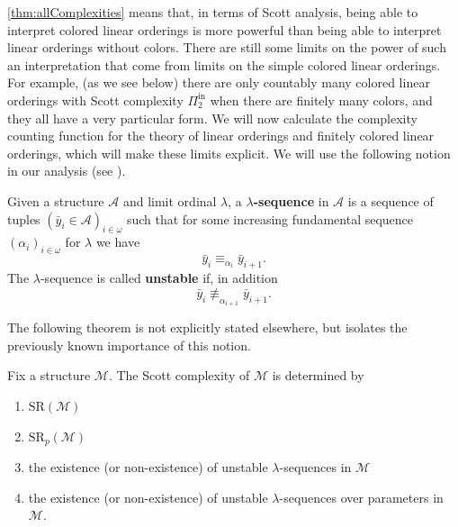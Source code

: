 \documentclass[11pt]{amsart}
\newcommand{\M}{\mathcal{M}}
\newcommand{\SR}{\text{SR}}
\newcommand{\mc}[1]{\mathcal{#1}}
\newcommand{\Pinf}[1]{\Pi^{\mathrm{in}}_{#1}}
\def\M{{\mathcal M}}
\theoremstyle{remark}
\newcommand{\define}[1]{\textbf{#1}}
\begin{document}
\cref{thm:allComplexities} means that, in terms of Scott analysis, being able to interpret colored linear orderings is more powerful than being able to interpret linear orderings without colors.
There are still some limits on the power of such an interpretation that come from limits on the simple colored linear orderings.
For example, (as we see below) there are only countably many colored linear orderings with Scott complexity $\Pinf{2}$ when there are finitely many colors, and they all have a very particular form.
We will now calculate the complexity counting function for the theory of linear orderings and finitely colored linear orderings, which will make these limits explicit.
We will use the following notion in our analysis (see \cite[Definition 1.8]{GR23}).

\begin{definition}[\cite{GR23}]
    Given a structure $\mc{A}$ and limit ordinal $\lambda$, a \define{$\lambda$-sequence} in $\mc{A}$ is a sequence of tuples $(\bar{y}_i\in\mc{A})_{i
			\in
		\omega}$ such that for some increasing fundamental sequence $(\alpha_i)_{i\in\omega}$ for $\lambda$ we have
    \[\bar{y}_i \equiv_{\alpha_i} \bar{y}_{i+1}. \]
    The $\lambda$-sequence is called \define{unstable} if, in addition
    \[\bar{y}_i \not\equiv_{\alpha_{i+1}} \bar{y}_{i+1}.\]

\end{definition}

The following theorem is not explicitly stated elsewhere, but isolates the previously known importance of this notion.
\begin{theorem}\label{thm:internalSC}
Fix a structure $\mc{M}$.
The Scott complexity of $\mc{M}$ is determined by
    \begin{enumerate}
        \item $\SR(\M)$
        \item $\SR_p(\M)$
        \item the existence (or non-existence) of unstable $\lambda$-sequences in $\mc{M}$
        \item the existence (or non-existence) of unstable $\lambda$-sequences over parameters in $\mc{M}$.
    \end{enumerate}
\end{theorem}
\end{document}
